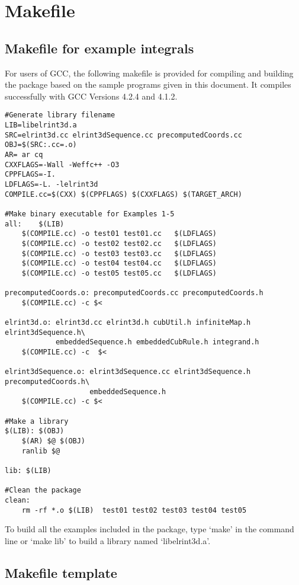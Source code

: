 \documentclass[10pt]{article}
\begin{document}
\section{Makefile}

\subsection{Makefile for example integrals}

For users of GCC, the following makefile is provided for compiling and building the package based on the sample programs given in this document. It compiles successfully with
GCC Versions 4.2.4 and 4.1.2.

\begin{verbatim}
#Generate library filename
LIB=libelrint3d.a
SRC=elrint3d.cc elrint3dSequence.cc precomputedCoords.cc
OBJ=$(SRC:.cc=.o)
AR= ar cq
CXXFLAGS=-Wall -Weffc++ -O3
CPPFLAGS=-I. 
LDFLAGS=-L. -lelrint3d
COMPILE.cc=$(CXX) $(CPPFLAGS) $(CXXFLAGS) $(TARGET_ARCH)

#Make binary executable for Examples 1-5
all:    $(LIB) 
    $(COMPILE.cc) -o test01 test01.cc   $(LDFLAGS)
    $(COMPILE.cc) -o test02 test02.cc   $(LDFLAGS)
    $(COMPILE.cc) -o test03 test03.cc   $(LDFLAGS)
    $(COMPILE.cc) -o test04 test04.cc   $(LDFLAGS)
    $(COMPILE.cc) -o test05 test05.cc   $(LDFLAGS)  

precomputedCoords.o: precomputedCoords.cc precomputedCoords.h
    $(COMPILE.cc) -c $<

elrint3d.o: elrint3d.cc elrint3d.h cubUtil.h infiniteMap.h elrint3dSequence.h\
            embeddedSequence.h embeddedCubRule.h integrand.h
    $(COMPILE.cc) -c  $<
    
elrint3dSequence.o: elrint3dSequence.cc elrint3dSequence.h precomputedCoords.h\
                    embeddedSequence.h          
    $(COMPILE.cc) -c $<

#Make a library 
$(LIB): $(OBJ)
    $(AR) $@ $(OBJ)
    ranlib $@
    
lib: $(LIB)

#Clean the package  
clean: 
    rm -rf *.o $(LIB)  test01 test02 test03 test04 test05
\end{verbatim}


To build all the examples included in the package, type `make' in the command line or `make lib' to build a library named `libelrint3d.a'. 

\subsection{Makefile template}
\end{document}
